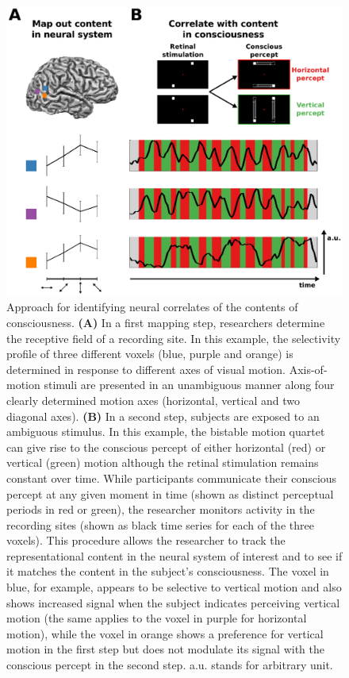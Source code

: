 \begin{figure}[!htbp]
\centering
\includegraphics[width=\textwidth]{figures/chapter_01/fig1.eps}
\caption{Approach for identifying neural correlates of the contents of consciousness. \textbf{(A)} In a first mapping step, researchers determine the receptive field of a recording site. In this example, the selectivity profile of three different voxels (blue, purple and orange) is determined in response to different axes of visual motion. Axis-of-motion stimuli are presented in an unambiguous manner along four clearly determined motion axes (horizontal, vertical and two diagonal axes). \textbf{(B)} In a second step, subjects are exposed to an ambiguous stimulus. In this example, the bistable motion quartet can give rise to the conscious percept of either horizontal (red) or vertical (green) motion although the retinal stimulation remains constant over time. While participants communicate their conscious percept at any given moment in time  (shown as distinct perceptual periods in red or green), the researcher monitors activity in the recording sites (shown as black time series for each of the three voxels). This procedure allows the researcher to track the representational content in the neural system of interest and to see if it matches the content in the subject's consciousness. The voxel in blue, for example, appears to be selective to vertical motion and also shows increased signal when the subject indicates perceiving vertical motion (the same applies to the voxel in purple for horizontal motion), while the voxel in orange shows a preference for vertical motion in the first step but does not modulate its signal with the conscious percept in the second step. a.u. stands for arbitrary unit.}
\label{fig:ncc} 
\end{figure}

